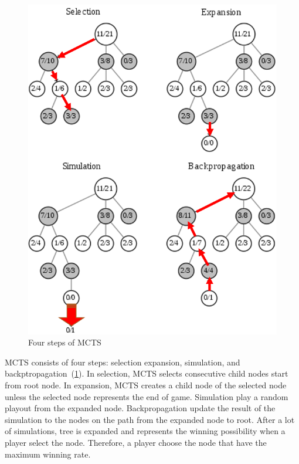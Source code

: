 \begin{figure}
\includegraphics[width=0.95\columnwidth]{figures/MCTS_step.PNG}
\caption{Four steps of MCTS}
\label{fig:MCTS_step}
\end{figure}

MCTS consists of four steps: selection expansion, simulation, and backptropagation~(\cref{fig:MCTS_step}).
In selection, MCTS selects consecutive child nodes start from root node. 
In expansion, MCTS creates a child node of the selected node unless the selected node represents the end of game.
Simulation play a random playout from the expanded node.
Backpropagation update the result of the simulation to the nodes on the path from the expanded node to root.
After a lot of simulations, tree is expanded and represents the winning possibility when a player select the node.
Therefore, a player choose the node that have the maximum winning rate.
